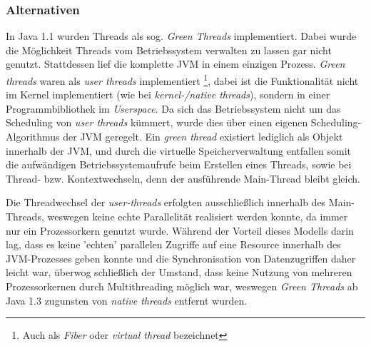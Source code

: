 \subsubsection{Alternativen}
In Java 1.1 wurden Threads als sog. \textit{Green Threads} implementiert. Dabei wurde die Möglichkeit Threads vom Betriebssystem verwalten zu lassen
gar nicht genutzt. Stattdessen lief die komplette JVM in einem einzigen Prozess.
\textit{Green threads} waren als \textit{user threads} implementiert \footnote{Auch als \textit{Fiber} oder \textit{virtual thread} bezeichnet},
dabei ist die Funktionalität
nicht im Kernel implementiert (wie bei \textit{kernel-/native threads}), sondern in einer Programmbibliothek im \textit{Userspace}.
Da sich das Betriebssystem nicht um das Scheduling von \textit{user threads} kümmert, wurde dies über einen eigenen Scheduling-Algorithmus der JVM
geregelt.\parencite{Oracle2010}
Ein \textit{green thread} existiert lediglich als Objekt innerhalb der JVM, und durch die virtuelle Speicherverwaltung entfallen somit
die aufwändigen Betriebssystemaufrufe beim
Erstellen eines Threads, sowie bei Thread- bzw. Kontextwechseln, denn der ausführende Main-Thread bleibt gleich.

Die Threadwechsel der \textit{user-threads} erfolgten ausschließlich innerhalb des Main-Threads, weswegen keine echte Parallelität realisiert werden konnte,
da immer nur ein Prozessorkern genutzt wurde.
Während der Vorteil dieses Modells darin lag, dass es keine 'echten' parallelen Zugriffe auf eine Resource innerhalb des JVM-Prozesses geben konnte
und die Synchronisation von Datenzugriffen daher leicht war, überwog schließlich der Umstand, dass keine Nutzung von mehreren Prozessorkernen
durch Multithreading möglich war, weswegen \textit{Green Threads} ab Java 1.3 zugunsten von \textit{native threads} entfernt wurden.

